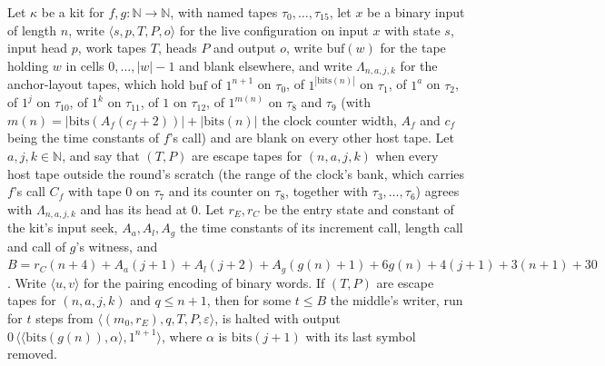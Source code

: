 \begin{theorem}
\label{Turing.NTimeDiag.qy_mid_run}
\leanok
{}
Let $\kappa$ be a kit for $f, g : \mathbb{N} \to \mathbb{N}$, with named tapes $\tau_0, \dots,
\tau_{15}$, let $x$ be a binary input of length $n$, write $\langle s, p, T, P, o\rangle$ for the
live configuration on input $x$ with state $s$, input head $p$, work tapes $T$, heads $P$ and
output $o$, write $\mathrm{buf}(w)$ for the tape holding $w$ in cells $0, \dots, |w| - 1$ and blank
elsewhere, and write $\Lambda_{n,a,j,k}$ for the anchor-layout tapes, which hold $\mathrm{buf}$ of
$1^{n+1}$ on $\tau_0$, of $1^{|\mathrm{bits}(n)|}$ on $\tau_1$, of $1^a$ on $\tau_2$, of $1^j$ on
$\tau_{10}$, of $1^k$ on $\tau_{11}$, of $1$ on $\tau_{12}$, of $1^{m(n)}$ on $\tau_8$ and $\tau_9$
(with $m(n) = |\mathrm{bits}(A_f(c_f + 2))| + |\mathrm{bits}(n)|$ the clock counter width, $A_f$
and $c_f$ being the time constants of $f$'s call) and are blank on every other host tape. Let $a,
j, k \in \mathbb{N}$, and say that $(T, P)$ are escape tapes for $(n, a, j, k)$ when every host
tape outside the round's scratch (the range of the clock's bank, which carries $f$'s call $C_f$
with tape $0$ on $\tau_7$ and its counter on $\tau_8$, together with $\tau_3, \dots, \tau_6$)
agrees with $\Lambda_{n,a,j,k}$ and has its head at $0$. Let $r_E, r_C$ be the entry state and
constant of the kit's input seek, $A_a, A_l, A_g$ the time constants of its increment call, length
call and call of $g$'s witness, and $B = r_C(n + 4) + A_a(j + 1) + A_l(j + 2) + A_g(g(n) + 1) +
6g(n) + 4(j + 1) + 3(n + 1) + 30$. Write $\langle u, v\rangle$ for the pairing encoding of binary
words. If $(T, P)$ are escape tapes for $(n, a, j, k)$ and $q \le n + 1$, then for some $t \le B$
the middle's writer, run for $t$ steps from $\langle (m_0, r_E), q, T, P, \varepsilon\rangle$, is
halted with output $0\,\langle\langle \mathrm{bits}(g(n)), \alpha\rangle, 1^{n+1}\rangle$, where
$\alpha$ is $\mathrm{bits}(j + 1)$ with its last symbol removed.
\end{theorem}

